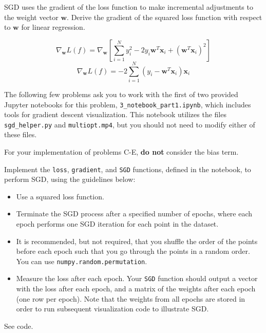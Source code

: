 \begin{problem}[2]
  SGD uses the gradient of the loss function to make incremental adjustments to the weight vector $\mathbf{w}$. Derive the gradient of the squared loss function with respect to $\mathbf{w}$ for linear regression.
\end{problem}
\begin{solution}
  \begin{equation}
    \nabla_\mathbf{w}L(f) = \nabla_\mathbf{w}\left[\sum_{i=1}^N y_i^2 - 2y_i\mathbf{w}^T\mathbf{x}_i+(\mathbf{w}^T\mathbf{x}_i)^2\right]
  \end{equation}
  \begin{equation}
    \nabla_\mathbf{w}L(f) = - 2\sum_{i=1}^N (y_i-\mathbf{w}^T\mathbf{x}_i)\mathbf{x}_i
  \end{equation}
\end{solution}

The following few problems ask you to work with the first of two provided Jupyter notebooks for this problem, \texttt{3_notebook_part1.ipynb}, which includes tools for gradient descent visualization. This notebook utilizes the files \texttt{sgd_helper.py} and \texttt{multiopt.mp4}, but you should not need to modify either of these files. 

For your implementation of problems C-E, \textbf{do not} consider the bias term.

\begin{problem}[8]
  Implement the \texttt{loss}, \texttt{gradient}, and \texttt{SGD} functions, defined in the notebook, to perform SGD, using the guidelines below:

  \begin{itemize}
    \item Use a squared loss function.
    \item Terminate the SGD process after a specified number of epochs, where each epoch performs one SGD iteration for each point in the dataset.
    \item It is recommended, but not required, that you shuffle the order of the points before each epoch such that you go through the points in a random order. You can use \texttt{numpy.random.permutation}.
    \item Measure the loss after each epoch. Your \texttt{SGD} function should output a vector with the loss after each epoch, and a matrix of the weights after each epoch (one row per epoch). Note that the weights from all epochs are stored in order to run subsequent visualization code to illustrate SGD.
  \end{itemize}
\end{problem}
\begin{solution}
See code. %
\end{solution}

